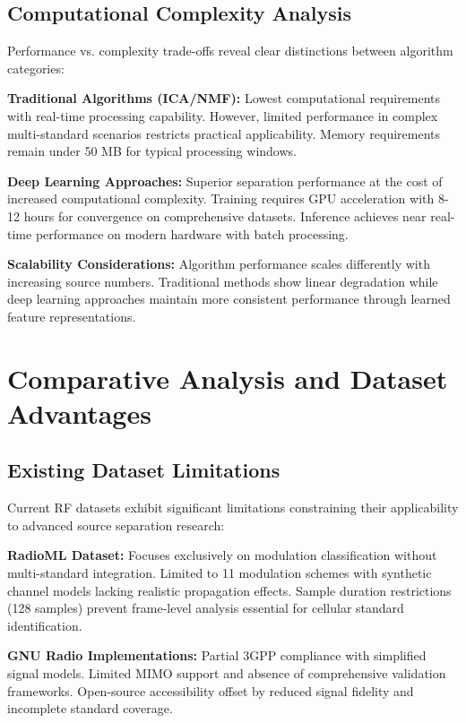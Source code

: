 \documentclass[twocolumn]{article}
\begin{document}
\subsection{Computational Complexity Analysis}

Performance vs. complexity trade-offs reveal clear distinctions between algorithm categories:

\textbf{Traditional Algorithms (ICA/NMF):} Lowest computational requirements with real-time processing capability. However, limited performance in complex multi-standard scenarios restricts practical applicability. Memory requirements remain under 50 MB for typical processing windows.

\textbf{Deep Learning Approaches:} Superior separation performance at the cost of increased computational complexity. Training requires GPU acceleration with 8-12 hours for convergence on comprehensive datasets. Inference achieves near real-time performance on modern hardware with batch processing.

\textbf{Scalability Considerations:} Algorithm performance scales differently with increasing source numbers. Traditional methods show linear degradation while deep learning approaches maintain more consistent performance through learned feature representations.

\section{Comparative Analysis and Dataset Advantages}

\subsection{Existing Dataset Limitations}

Current RF datasets exhibit significant limitations constraining their applicability to advanced source separation research:

\textbf{RadioML Dataset:} Focuses exclusively on modulation classification without multi-standard integration. Limited to 11 modulation schemes with synthetic channel models lacking realistic propagation effects. Sample duration restrictions (128 samples) prevent frame-level analysis essential for cellular standard identification.

\textbf{GNU Radio Implementations:} Partial 3GPP compliance with simplified signal models. Limited MIMO support and absence of comprehensive validation frameworks. Open-source accessibility offset by reduced signal fidelity and incomplete standard coverage.
\end{document}
